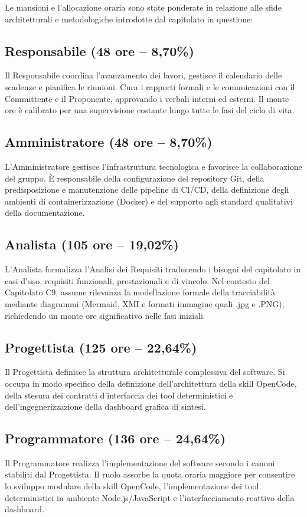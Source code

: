 \documentclass[a4paper, 11pt]{article}
\begin{document}
Le mansioni e l'allocazione oraria sono state ponderate in relazione alle sfide architetturali e metodologiche introdotte dal capitolato in questione:

\subsection{Responsabile (48 ore -- 8,70\%)}
Il Responsabile coordina l'avanzamento dei lavori, gestisce il calendario delle scadenze e pianifica le riunioni. Cura i rapporti formali e le comunicazioni con il Committente e il Proponente, approvando i verbali interni ed esterni. Il monte ore è calibrato per una supervisione costante lungo tutte le fasi del ciclo di vita.

\subsection{Amministratore (48 ore -- 8,70\%)}
L'Amministratore gestisce l'infrastruttura tecnologica e favorisce la collaborazione del gruppo. È responsabile della configurazione del repository Git, della predisposizione e manutenzione delle pipeline di CI/CD, della definizione degli ambienti di containerizzazione (Docker) e del supporto agli standard qualitativi della documentazione.

\subsection{Analista (105 ore -- 19,02\%)}
L'Analista formalizza l'Analisi dei Requisiti traducendo i bisogni del capitolato in casi d'uso, requisiti funzionali, prestazionali e di vincolo. Nel contesto del Capitolato C9, assume rilevanza la modellazione formale della tracciabilità mediante diagrammi (Mermaid, XMI e formati immagine quali .jpg e .PNG), richiedendo un monte ore significativo nelle fasi iniziali.

\subsection{Progettista (125 ore -- 22,64\%)}
Il Progettista definisce la struttura architetturale complessiva del software. Si occupa in modo specifico della definizione dell'architettura della skill OpenCode, della stesura dei contratti d'interfaccia dei tool deterministici e dell'ingegnerizzazione della dashboard grafica di sintesi.

\subsection{Programmatore (136 ore -- 24,64\%)}
Il Programmatore realizza l'implementazione del software secondo i canoni stabiliti dal Progettista. Il ruolo assorbe la quota oraria maggiore per consentire lo sviluppo modulare della skill OpenCode, l'implementazione dei tool deterministici in ambiente Node.js/JavaScript e l'interfacciamento reattivo della dashboard.
\end{document}
